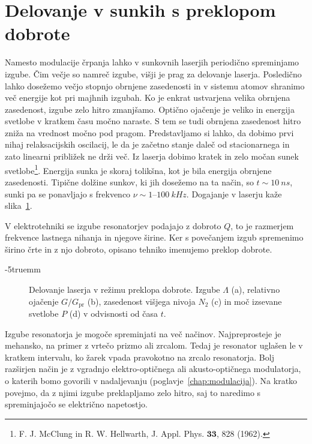 \section{Delovanje v sunkih s preklopom dobrote}
\label{qswitch}
Namesto modulacije črpanja lahko v sunkovnih laserjih periodično spreminjamo 
izgube. Čim večje so namreč izgube, višji 
je prag za delovanje laserja. 
Posledično lahko dosežemo večjo stopnjo obrnjene zasedenosti in v sistemu atomov shranimo več 
energije kot pri majhnih izgubah.
Ko je enkrat ustvarjena velika obrnjena zasedenost, izgube zelo hitro zmanjšamo. 
Optično ojačenje je veliko in energija svetlobe v kratkem času močno naraste. 
S tem se tudi obrnjena zasedenost hitro zniža na vrednost močno pod pragom.
Predstavljamo si lahko, da dobimo prvi nihaj relaksacijskih oscilacij, le da
je začetno stanje daleč od stacionarnega in zato linearni približek ne drži več.
Iz laserja dobimo kratek in zelo močan sunek svetlobe\footnote{F. J.
McClung in R. W. Hellwarth, J. Appl. Phys. $\mathbf{33}$, 828 (1962).}. Energija
sunka je skoraj tolikšna, kot je bila energija obrnjene zasedenosti. 
Tipične dolžine sunkov, ki jih dosežemo na ta način, so $t \sim 10~\si{ns}$, sunki
pa se ponavljajo s frekvenco $\nu \sim 1$--$100~\si{kHz}$.
Dogajanje v laserju kaže slika~\ref{fig:pulseQ}.

\begin{remark}
V elektrotehniki se izgube resonatorjev podajajo z dobroto $Q$, to je razmerjem
frekvence lastnega nihanja in njegove širine. Ker s povečanjem izgub spremenimo 
širino črte in z njo dobroto, opisano tehniko imenujemo preklop 
dobrote.
\end{remark}
\vglue-5truemm
\begin{figure}[h]
\centering
\def\svgwidth{90truemm} 

\caption{Delovanje laserja v režimu preklopa dobrote. Izgube $\Lambda$ (a), relativno 
ojačenje $G/G_\mathrm{pr}$ (b), 
zasedenost višjega nivoja $N_2$ (c) in moč izsevane svetlobe $P$ (d) v odvisnosti od časa $t$.}
\label{fig:pulseQ}
\end{figure}

Izgube resonatorja je mogoče spreminjati na več načinov. Najpreprosteje
je mehansko, na primer z vrtečo prizmo ali zrcalom. Tedaj je resonator uglašen le v kratkem
intervalu, ko žarek vpada pravokotno na zrcalo resonatorja. Bolj razširjen način 
je z vgradnjo elektro-optičnega ali akusto-optičnega modulatorja, o katerih
bomo govorili v nadaljevanju (poglavje~\ref{chap:modulacija}). Na kratko povejmo, 
da z njimi izgube preklapljamo zelo hitro, saj to naredimo s spreminjajočo se 
električno napetostjo.

